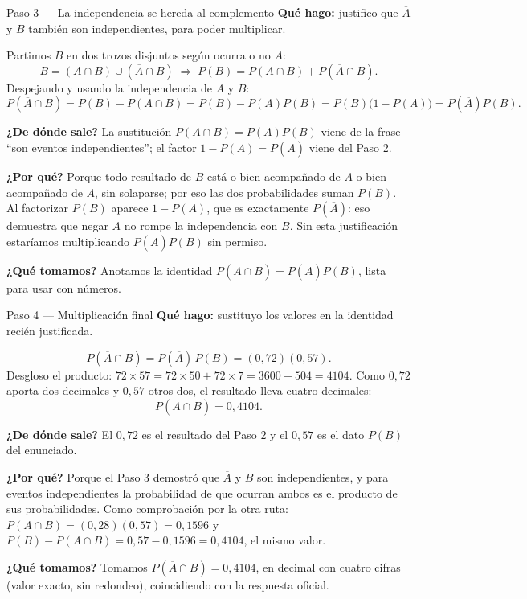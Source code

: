 \documentclass[11pt]{article}
\begin{document}
\begin{paso}{Paso 3 --- La independencia se hereda al complemento}
\textbf{Qué hago:} justifico que $\overline{A}$ y $B$ también son independientes, para poder multiplicar.

Partimos $B$ en dos trozos disjuntos según ocurra o no $A$:
\[
B=(A\cap B)\cup(\overline{A}\cap B)
\;\Longrightarrow\;
P(B)=P(A\cap B)+P(\overline{A}\cap B).
\]
Despejando y usando la independencia de $A$ y $B$:
\[
P(\overline{A}\cap B)=P(B)-P(A\cap B)=P(B)-P(A)P(B)=P(B)\bigl(1-P(A)\bigr)=P(\overline{A})P(B).
\]

\textbf{¿De dónde sale?} La sustitución $P(A\cap B)=P(A)P(B)$ viene de la frase ``son eventos independientes''; el factor $1-P(A)=P(\overline{A})$ viene del Paso 2.

\textbf{¿Por qué?} Porque todo resultado de $B$ está o bien acompañado de $A$ o bien acompañado de $\overline{A}$, sin solaparse; por eso las dos probabilidades suman $P(B)$. Al factorizar $P(B)$ aparece $1-P(A)$, que es exactamente $P(\overline{A})$: eso demuestra que negar $A$ no rompe la independencia con $B$. Sin esta justificación estaríamos multiplicando $P(\overline{A})P(B)$ sin permiso.

\textbf{¿Qué tomamos?} Anotamos la identidad $P(\overline{A}\cap B)=P(\overline{A})P(B)$, lista para usar con números.
\end{paso}

\begin{paso}{Paso 4 --- Multiplicación final}
\textbf{Qué hago:} sustituyo los valores en la identidad recién justificada.

\[
P(\overline{A}\cap B)=P(\overline{A})\,P(B)=(0{,}72)(0{,}57).
\]
Desgloso el producto: $72\times 57=72\times 50+72\times 7=3600+504=4104$. Como $0{,}72$ aporta dos decimales y $0{,}57$ otros dos, el resultado lleva cuatro decimales:
\[
P(\overline{A}\cap B)=0{,}4104.
\]

\textbf{¿De dónde sale?} El $0{,}72$ es el resultado del Paso 2 y el $0{,}57$ es el dato $P(B)$ del enunciado.

\textbf{¿Por qué?} Porque el Paso 3 demostró que $\overline{A}$ y $B$ son independientes, y para eventos independientes la probabilidad de que ocurran ambos es el producto de sus probabilidades. Como comprobación por la otra ruta: $P(A\cap B)=(0{,}28)(0{,}57)=0{,}1596$ y $P(B)-P(A\cap B)=0{,}57-0{,}1596=0{,}4104$, el mismo valor.

\textbf{¿Qué tomamos?} Tomamos $P(\overline{A}\cap B)=0{,}4104$, en decimal con cuatro cifras (valor exacto, sin redondeo), coincidiendo con la respuesta oficial.
\end{paso}
\end{document}
